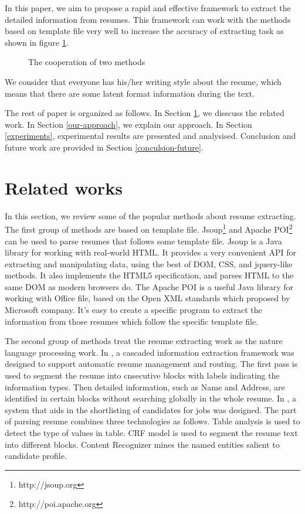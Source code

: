 \documentclass{acm_proc_article-sp}
\begin{document}
In this paper, we aim to propose a rapid and effective framework to extract the detailed information from resumes. 
This framework can work with the methods based on template file very well to increase the accuracy of extracting task as shown in figure \ref{cooperation}.

\begin{figure}\label{cooperation}
\centering
{}
\caption{The cooperation of two methods}
\end{figure}


We consider that everyone has his/her writing style about the resume, which means that there are some latent format information during the text.

The rest of paper is organized as follows. In Section \ref{related-works}, we disscuss the related work. In Section \ref{our-approach}, we explain our approach. In Section \ref{experiments}, experimental results are presented and analysised. Conclusion and future work are provided in Section \ref{conculsion-future}.

\section{Related works}\label{related-works}

In this section, we review some of the popular methods about resume extracting.
The first group of methods are based  on template file.
Jsoup\footnote{http://jsoup.org} and Apache POI\footnote{http://poi.apache.org} can be used to parse resumes that follows some template file.
Jsoup is a Java library for working with real-world HTML. 
It provides a very convenient API for extracting and manipulating data, using the best of DOM, CSS, and jquery-like methods.
It also implements the HTML5 specification, and parses HTML to the same DOM as modern browsers do.
The Apache POI is a useful Java library for working with Office file, based on the Open XML standards which proposed by Microsoft company.
It's easy to create a specific program to extract the information from those resumes which follow the specific template file.

The second group of methods treat the resume extracting work as the nature language processing work. 
In \cite{Yu:2005:RIE:1219840.1219902}, a cascaded information extraction framework was designed to support automatic resume management and routing.
The first pass is used to segment the resume into cnsecutive blocks with labels indicating the information types. 
Then detailed information, such as Name and Address, are identified in certain blocks without searching globally in the whole resume.
In \cite{Singh:2010:PSS:1871437.1871523}, a system that aids in the shortlisting of candidates for jobs was designed. 
The part of parsing resume combines three technologies as follows.
Table analysis is used to detect the type of values in table. 
CRF model is used to segment the resume text into different blocks. 
Content Recognizer mines the named entities salient to candidate profile.
\end{document}
